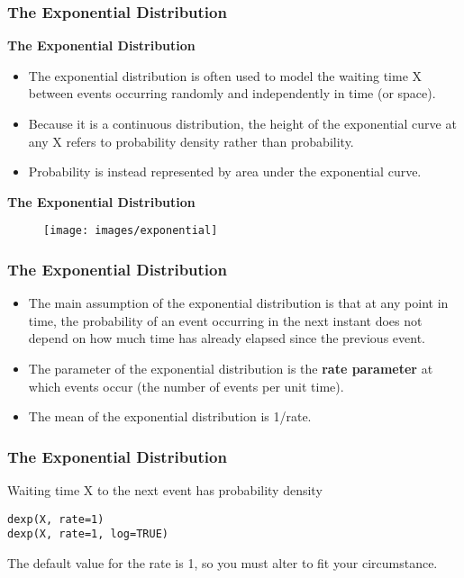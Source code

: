 \documentclass[MAIN.tex]{subfiles}
\begin{document}
 
	\begin{frame}[fragile]
		\frametitle{The Exponential Distribution}
\large
\textbf{The Exponential Distribution}
\begin{itemize}
\item The exponential distribution is often used to model the waiting time X between events occurring randomly and independently in time (or space).\item  Because it is a continuous distribution, the height of the exponential curve at any X refers to probability density rather than probability.
\item  Probability is instead represented by area under the exponential curve.
\end{itemize}

\end{frame}	

\begin{frame}
\textbf{The Exponential Distribution}
	\begin{figure}
\centering
\texttt{[image: images/exponential]}
\end{figure}
\end{frame}
\begin{frame}[fragile]
	\frametitle{The Exponential Distribution}
		\large
\begin{itemize}
\item The main assumption of the exponential distribution is that at any point in time, the probability of an event occurring in the next instant does not depend on how much time has already elapsed since the previous event. 
\item The parameter of the exponential distribution is the \textbf{rate parameter} at which events occur (the number of events per unit time). \item The mean of the exponential distribution is 1/rate.
\end{itemize}

\end{frame}
\begin{frame}[fragile]
	\frametitle{The Exponential Distribution}
	\large

Waiting time X to the next event has probability density

\begin{framed}
\begin{verbatim}
dexp(X, rate=1)
dexp(X, rate=1, log=TRUE)
\end{verbatim}
\end{framed}
The default value for the rate is 1, so you must alter to fit your circumstance.

\end{frame}
\end{document}
